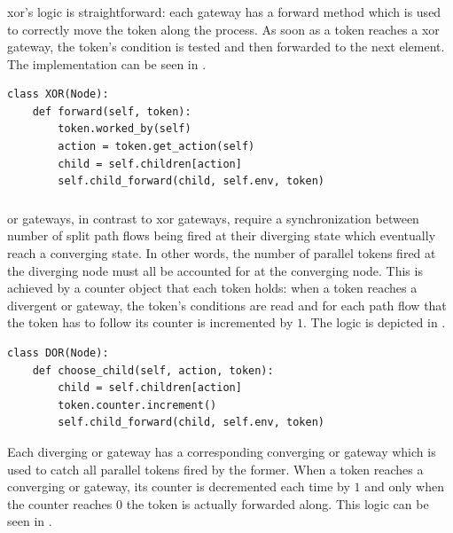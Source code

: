 \subsubsection{}

\gls{xor}'s logic is straightforward: each gateway has a forward method which is used to correctly move the token along the process. As soon as a token reaches a \gls{xor} gateway, the token's condition is tested and then forwarded to the next element. The implementation can be seen in . 

\begin{lstlisting}[caption=\glsentryshort{xor}'s forward method,label=lst:xor_forward,style=CustomPython]
class XOR(Node):
    def forward(self, token):
        token.worked_by(self)
        action = token.get_action(self)
        child = self.children[action]
        self.child_forward(child, self.env, token)
\end{lstlisting}

\subsubsection{}

\gls{or} gateways, in contrast to \gls{xor} gateways, require a synchronization between number of split path flows being fired at their diverging state which eventually reach a converging state. In other words, the number of parallel tokens fired at the diverging node must all be accounted for at the converging node. This is achieved by a counter object that each token holds: when a token reaches a divergent \gls{or} gateway, the token's conditions are read and for each path flow that the token has to follow its counter is incremented by $1$. The logic is depicted in .

\begin{lstlisting}[caption=Token's counter increment logic at a divergent \glsentryshort{or} gateway,label=lst:or_counter_increment,style=CustomPython]
class DOR(Node):
    def choose_child(self, action, token):
        child = self.children[action]
        token.counter.increment()
        self.child_forward(child, self.env, token)
\end{lstlisting}

Each diverging \gls{or} gateway has a corresponding converging \gls{or} gateway which is used to catch all parallel tokens fired by the former. When a token reaches a converging \gls{or} gateway, its counter is decremented each time by $1$ and only when the counter reaches $0$ the token is actually forwarded along. This logic can be seen in .

